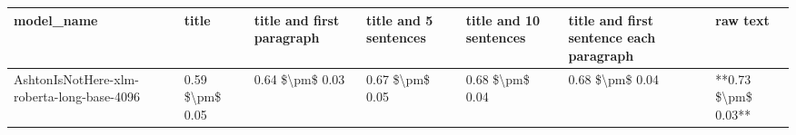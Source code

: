 \begin{tabular}{lllllll}
\toprule
                                model\_name &           title & title and first paragraph & title and 5 sentences & title and 10 sentences & title and first sentence each paragraph &            raw text \\
\midrule
AshtonIsNotHere-xlm-roberta-long-base-4096 & 0.59 \$\textbackslash pm\$ 0.05 &           0.64 \$\textbackslash pm\$ 0.03 &       0.67 \$\textbackslash pm\$ 0.05 &        0.68 \$\textbackslash pm\$ 0.04 &                         0.68 \$\textbackslash pm\$ 0.04 & **0.73 \$\textbackslash pm\$ 0.03** \\
\bottomrule
\end{tabular}
